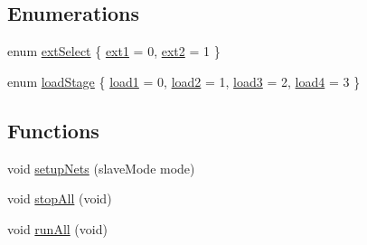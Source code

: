\subsection*{Enumerations}
\begin{DoxyCompactItemize}
\item 
enum \hyperlink{a00027_a258413561252a6c94af200747272a9f3}{ext\-Select} \{ \hyperlink{a00027_a258413561252a6c94af200747272a9f3a6b8e8e9bb4b53b3fc029110541623a3c}{ext1} = 0, 
\hyperlink{a00027_a258413561252a6c94af200747272a9f3a6b3e8213ce7722257795b7a3ffb915fc}{ext2} = 1
 \}
\item 
enum \hyperlink{a00027_a2820f1e18d921d2f1e97d53404b9fbae}{load\-Stage} \{ \hyperlink{a00027_a2820f1e18d921d2f1e97d53404b9fbaeae319629172a300013df8b0149c386f96}{load1} = 0, 
\hyperlink{a00027_a2820f1e18d921d2f1e97d53404b9fbaea690fc43c88b8671aff6aed61a8a2f9c6}{load2} = 1, 
\hyperlink{a00027_a2820f1e18d921d2f1e97d53404b9fbaea861124cff343ddc4d2cc20dfe3ee7fa2}{load3} = 2, 
\hyperlink{a00027_a2820f1e18d921d2f1e97d53404b9fbaea94258908ecc1dedac8f08e7baf1156fc}{load4} = 3
 \}
\end{DoxyCompactItemize}
\subsection*{Functions}
\begin{DoxyCompactItemize}
\item 
void \hyperlink{a00027_a0ae5a77eff5aae0f7aead915fe68328b}{setup\-Nets} (slave\-Mode mode)
\item 
void \hyperlink{a00027_a776854c00eb8a571abbfb27130ba4849}{stop\-All} (void)
\item 
void \hyperlink{a00027_a24dce601551d1d81b127711d2f4aabdd}{run\-All} (void)
\end{DoxyCompactItemize}
